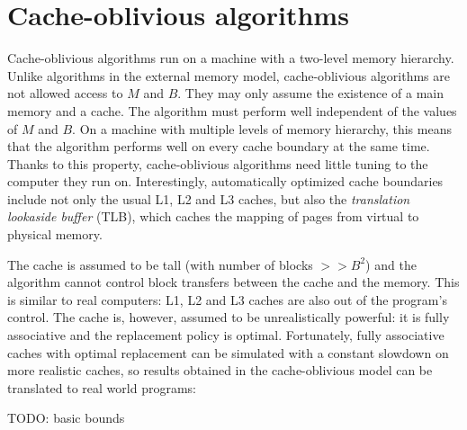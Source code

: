 \section{Cache-oblivious algorithms}
Cache-oblivious algorithms run on a machine with a two-level memory hierarchy.
Unlike algorithms in the external memory model, cache-oblivious algorithms
are not allowed access to $M$ and $B$. They may only assume the existence
of a main memory and a cache.
The algorithm must perform well independent of the values of $M$ and $B$.
On a machine with multiple levels of memory hierarchy, this means that
the algorithm performs well on every cache boundary at the same time.
Thanks to this property, cache-oblivious algorithms need little tuning to the
computer they run on. Interestingly, automatically optimized cache boundaries
include not only the usual L1, L2 and L3 caches, but also the \emph{translation
lookaside buffer} (TLB), which caches the mapping of pages from virtual to
physical memory.

The cache is assumed to be tall (with number of blocks $>> B^2$) and
the algorithm cannot control block transfers between the cache and the memory.
This is similar to real computers: L1, L2 and L3 caches are also out
of the program's control.
The cache is, however, assumed to be unrealistically powerful: it is fully
associative and the replacement policy is optimal. Fortunately, fully
associative caches with optimal replacement can be simulated with a constant
slowdown on more realistic caches, so results obtained in the cache-oblivious
model can be translated to real world programs:

\proof{
}

TODO: basic bounds
